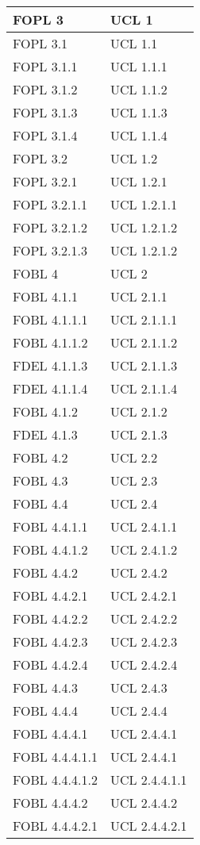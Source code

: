 \begin{longtable}{XX}
FOPL 3&UCL 1\\
\midrule
FOPL 3.1&UCL 1.1\\
\midrule
FOPL 3.1.1&UCL 1.1.1\\
\midrule
FOPL 3.1.2&UCL 1.1.2\\
\midrule
FOPL 3.1.3&UCL 1.1.3\\
\midrule
FOPL 3.1.4&UCL 1.1.4\\
\midrule
FOPL 3.2&UCL 1.2\\
\midrule
FOPL 3.2.1&UCL 1.2.1\\
\midrule
FOPL 3.2.1.1&UCL 1.2.1.1\\
\midrule
FOPL 3.2.1.2&UCL 1.2.1.2\\
\midrule
FOPL 3.2.1.3&UCL 1.2.1.2\\
\midrule
FOBL 4&UCL 2\\
\midrule
FOBL 4.1.1&UCL 2.1.1\\
\midrule
FOBL 4.1.1.1&UCL 2.1.1.1\\
\midrule
FOBL 4.1.1.2&UCL 2.1.1.2\\
\midrule
FDEL 4.1.1.3&UCL 2.1.1.3\\
\midrule
FDEL 4.1.1.4&UCL 2.1.1.4\\
\midrule
FOBL 4.1.2&UCL 2.1.2\\
\midrule
FDEL 4.1.3&UCL 2.1.3\\
\midrule
FOBL 4.2&UCL 2.2\\
\midrule
FOBL 4.3&UCL 2.3\\
\midrule
FOBL 4.4&UCL 2.4\\
\midrule
FOBL 4.4.1.1&UCL 2.4.1.1\\
\midrule
FOBL 4.4.1.2&UCL 2.4.1.2\\
\midrule
FOBL 4.4.2&UCL 2.4.2\\
\midrule
FOBL 4.4.2.1&UCL 2.4.2.1\\
\midrule
FOBL 4.4.2.2&UCL 2.4.2.2\\
\midrule
FOBL 4.4.2.3&UCL 2.4.2.3\\
\midrule
FOBL 4.4.2.4&UCL 2.4.2.4\\
\midrule
FOBL 4.4.3&UCL 2.4.3\\
\midrule
FOBL 4.4.4&UCL 2.4.4\\
\midrule
FOBL 4.4.4.1&UCL 2.4.4.1\\
\midrule
FOBL 4.4.4.1.1&UCL 2.4.4.1\\
\midrule
FOBL 4.4.4.1.2&UCL 2.4.4.1.1\\
\midrule
FOBL 4.4.4.2&UCL 2.4.4.2\\
\midrule
FOBL 4.4.4.2.1&UCL 2.4.4.2.1\\

\end{longtable}
